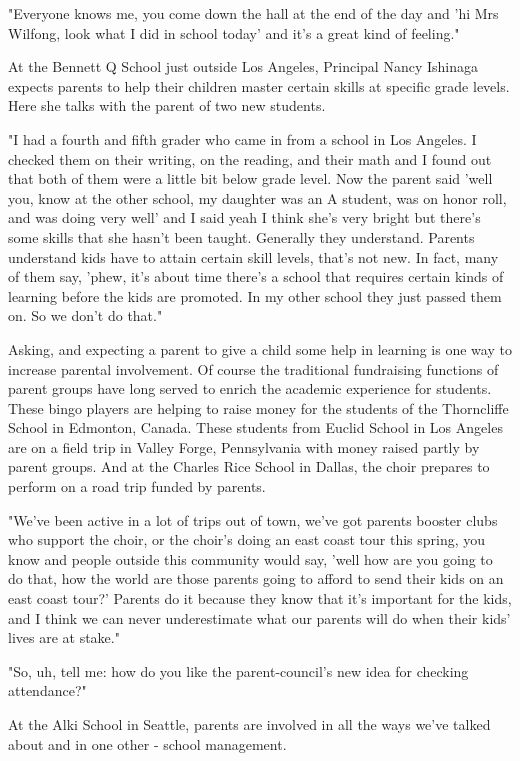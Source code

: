 "Everyone knows me, you come down the hall at the end of the day and 'hi Mrs Wilfong, look what I did in school today' and it's a great kind of feeling."

At the Bennett Q School just outside Los Angeles, Principal Nancy Ishinaga expects parents to help their children master certain skills at specific grade levels. Here she talks with the parent of two new students.

"I had a fourth and fifth grader who came in from a school in Los Angeles. I checked them on their writing, on the reading, and their math and I found out that both of them were a little bit below grade level. Now the parent said 'well you, know at the other school, my daughter was an A student, was on honor roll, and was doing very well' and I said yeah I think she's very bright but there's some skills that she hasn't been taught. Generally they understand. Parents understand kids have to attain certain skill levels, that's not new. In fact, many of them say, 'phew, it's about time there's a school that requires certain kinds of learning before the kids are promoted. In my other school they just passed them on. So we don't do that."

Asking, and expecting a parent to give a child some help in learning is one way to increase parental involvement. Of course the traditional fundraising functions of parent groups have long served to enrich the academic experience for students. These bingo players are helping to raise money for the students of the Thorncliffe School in Edmonton, Canada. These students from Euclid School in Los Angeles are on a field trip in Valley Forge, Pennsylvania with money raised partly by parent groups. And at the Charles Rice School in Dallas, the choir prepares to perform on a road trip funded by parents.

"We've been active in a lot of trips out of town, we've got parents booster clubs who support the choir, or the choir's doing an east coast tour this spring, you know and people outside this community would say, 'well how are you going to do that, how the world are those parents going to afford to send their kids on an east coast tour?' Parents do it because they know that it's important for the kids, and I think we can never underestimate what our parents will do when their kids' lives are at stake."

"So, uh, tell me: how do you like the parent-council's new idea for checking attendance?"

At the Alki School in Seattle, parents are involved in all the ways we've talked about and in one other - school management.

